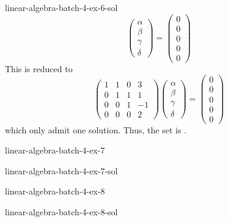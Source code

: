 \documentclass[preview]{standalone}
\begin{document}
\begin{snippetsolution}{linear-algebra-batch-4-ex-6-sol}{}
\[        \begin{pmatrix}
            \alpha \\ \beta \\ \gamma \\ \delta
        \end{pmatrix}
        =
        \begin{pmatrix}
            0 \\ 0 \\ 0 \\ 0 \\ 0
        \end{pmatrix}
    \]
    This is reduced to
    \[
        \begin{pmatrix}
            1 & 1 & 0 & 3 \\
            0 & 1 & 1 & 1 \\
            0 & 0 & 1 & -1 \\
            0 & 0 & 0 & 2
        \end{pmatrix}
        \begin{pmatrix}
            \alpha \\ \beta \\ \gamma \\ \delta
        \end{pmatrix}
        =
        \begin{pmatrix}
            0 \\ 0 \\ 0 \\ 0 \\ 0
        \end{pmatrix}
    \]
    which only admit one solution. Thus, the set is \linearlyindependent.
\end{snippetsolution}

\begin{snippetexercise}{linear-algebra-batch-4-ex-7}{}
    \todo
\end{snippetexercise}

\begin{snippetsolution}{linear-algebra-batch-4-ex-7-sol}{}
    \todo
\end{snippetsolution}

\begin{snippetexercise}{linear-algebra-batch-4-ex-8}{}
    \todo
\end{snippetexercise}

\begin{snippetsolution}{linear-algebra-batch-4-ex-8-sol}{}
    \todo
\end{snippetsolution}
\end{document}

